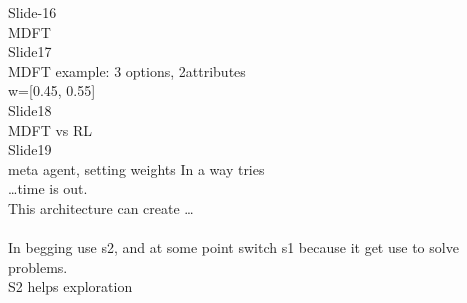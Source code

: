 \documentclass{article}
\begin{document}
Slide-16 \\
MDFT \\
Slide17 \\
MDFT example: 3 options, 2attributes \\
w=[0.45, 0.55] \\
Slide18 \\
MDFT vs RL \\
Slide19 \\
 meta agent, setting weights In a way tries \\
…time is out. \\
This architecture can create … \\
 \\
In begging use s2, and at some point switch s1 because it get use to solve problems. \\
S2 helps exploration \\
\end{document}
